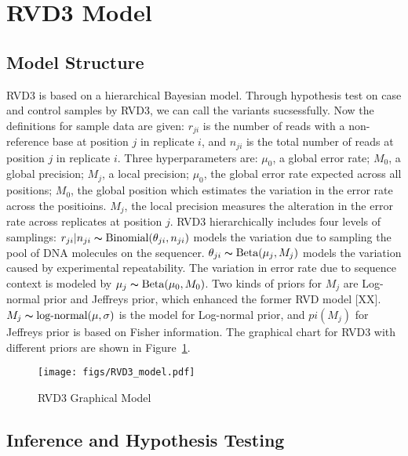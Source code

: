\documentclass[11pt,reqno]{amsart}
\begin{document}
\section{RVD3 Model}

\subsection{Model Structure}\label{sec:model_structure}
RVD3 is based on a hierarchical Bayesian model. Through hypothesis test on case and control samples by RVD3, we can call the variants sucsessfully. Now the definitions for sample data are given: $r_{ji}$ is the number of reads with a non-reference base at position $j$ in replicate $i$, and $n_{ji}$ is the total number of reads at position $j$ in replicate $i$. Three hyperparameters are:  $\mu_0$, a global error rate; $M_0$, a global precision; $M_j$, a local precision; $\mu_0$, the global error rate expected across all positions; $M_0$, the global position which estimates the variation in the error rate across the positioins. $M_j$, the local precision measures the alteration in the error rate across replicates at position $j$.
RVD3 hierarchically includes four levels of samplings:  $r_{ji} | n_{ji} \thicksim \text{Binomial}(\theta_{ji}, n_{ji})$ models the variation due to sampling the pool of DNA molecules on the sequencer. $\theta_{ji} \thicksim \text{Beta}(\mu_j, M_j)$ models the variation caused by experimental repeatability. The variation in error rate due to sequence context is modeled by $\mu_j \thicksim \text{Beta}(\mu_0, M_0)$. Two kinds of priors for $M_{j}$ are Log-normal prior and Jeffreys prior, which enhanced the former RVD model [XX]. $ M_{j} \thicksim \text{log-normal}(\mu, \sigma)$ is the model for Log-normal prior, and $pi\left({M}_{j}\right)$ for Jeffreys prior is based on Fisher information. The graphical chart for RVD3 with different priors are shown in Figure~\ref{fig:graphical_model}.

\begin{figure}[h]
\begin{center}
\texttt{[image: figs/RVD3\_model.pdf]}
\caption{RVD3 Graphical Model}
\label{fig:graphical_model}
\end{center}
\end{figure}


\subsection{Inference and Hypothesis Testing}
\end{document}
